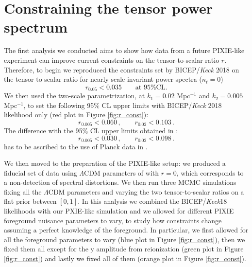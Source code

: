 \section{Constraining the tensor power spectrum}
The first analysis we conducted aims to show how data from a future PIXIE-like experiment can improve current constraints on the tensor-to-scalar ratio $r$. Therefore, to begin we reproduced the constraints set by BICEP/\emph{Keck} 2018 on the tensor-to-scalar ratio for nearly scale invariant power spectra ($n_t=0$) 
\begin{equation*}
r_{0.05}< 0.035\qquad \text{at 95\% CL.}
\end{equation*}
We then used the two-scale parametrization,  at $k_1=0.02$ Mpc$^{-1}$ and $k_2=0.005$ Mpc$^{-1}$, to set the following 95\% CL upper limits with BICEP/\textit{Keck} 2018 likelihood only (red plot in Figure \ref{fig:r_const}):
\begin{equation*}
r_{0.005}<0.060 \,, \qquad r_{0.02}<0.103 \,.
\end{equation*}
The difference with the 95\% CL upper limits obtained in \cite{Paoletti_2022}:
\begin{equation*}
r_{0.005}<0.030 \,, \qquad r_{0.02}<0.098 \,.
\end{equation*}
has to be ascribed to the use of Planck data in \cite{Paoletti_2022}.

We then moved to the preparation of the PIXIE-like setup: we produced a fiducial set of data using $\Lambda$CDM parameters of \cite{planck2018results} with $r=0$, which corresponds to a non-detection of spectral distortions. We then run three MCMC simulations fixing all the $\Lambda$CDM parameters and varying the two tensor-to-scalar ratios on a flat prior between $[0,1]$. In this analysis we combined the BICEP/\emph{Keck}18 likelihoods with our PXIE-like simulation and we allowed for different PIXIE foreground nuisance parameters to vary, to study how constraints change assuming a perfect knowledge of the foreground. In particular, we first allowed for all the foreground parameters to vary (blue plot in Figure \ref{fig:r_const}), then we fixed them all except for the y amplitude from reionization (green plot in Figure \ref{fig:r_const}) and lastly we fixed all of them (orange plot in Figure \ref{fig:r_const}). 

